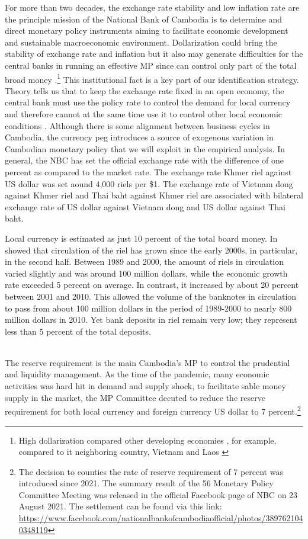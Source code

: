 \documentclass[11pt,letterpaper]{article}
\begin{document}
For more than two decades, the exchange rate stability and low inflation rate are the principle mission of the National Bank of Cambodia is to determine and direct monetary policy instruments aiming to facilitate economic development and sustainable macroeconomic environment. Dollarization could bring the stability of exchange rate and inflation but it also may generate difficulties for the central banks in running an effective MP since can control only part of the total broad money \cite{Mohsin1992}.\footnote{High dollarization compared other developing economies \cite{Ra2008}, for example, compared to it neighboring country, Vietnam and Laos \cite{Khou2013}} This institutional fact is a key part of our identification strategy. Theory tells us that to keep the exchange rate fixed in an open economy, the central bank must use the policy rate to control the demand for local currency and therefore cannot at the same time use it to control other local economic conditions \cite{Fleming1962, Mundell1963}. Although there is some alignment between business cycles in Cambodia, the currency peg introduces a source of exogenous variation in Cambodian monetary policy that we will exploit in the empirical analysis. In general, the NBC has set the official exchange rate with the difference of one percent as compared to the market rate. The exchange rate Khmer riel against US dollar was set aound 4,000 riels per \$1. The exchange rate of Vietnam dong against Khmer riel and Thai baht against Khmer riel are associated with bilateral exchange rate of US dollar against Vietnam dong and US dollar against Thai baht. 


Local currency is estimated as just 10 percent of the total board money. In \citet{Khou2013} showed that circulation of the riel has grown since the early 2000s, in particular, in the second half. Between 1989 and 2000, the amount of riels in circulation varied slightly and was around 100 million dollars, while the economic growth rate exceeded 5 percent on average. In contrast, it increased by about 20 percent between 2001 and 2010. This allowed the volume of the banknotes in circulation to pass from about 100 million dollars in the period of 1989-2000 to nearly 800 million dollars in 2010. Yet bank deposits in riel remain very low; they represent less than 5 percent of the total deposits. 


\\

The reserve requirement is the main Cambodia's MP to control the prudential and liquidity management. As the time of the pandemic, many economic activities was hard hit in demand and supply shock, to facilitate sable money supply in the market, the MP Committee decuted  to reduce the reserve requirement for both local currency and foreign currency US dollar to 7 percent.\footnote{The decision to counties the rate of reserve requirement of 7 percent was introduced since 2021. The summary result of the 56 Monetary Policy Committee Meeting was released in the official Facebook page of NBC on 23 August 2021. The settlement can be found via this link: \url{https://www.facebook.com/nationalbankofcambodiaofficial/photos/3897621040348119}} 
\end{document}
